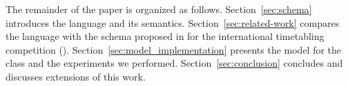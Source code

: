 The remainder of the paper is organized as follows.
Section~\ref{sec:schema} introduces the {\UTP} language and its semantics.
Section~\ref{sec:related-work} compares the \UTP{} language with the schema proposed in \cite{2018muller,ITC2019} for the international timetabling competition ({\ITC}).
Section~\ref{sec:model_implementation} presents the {\CP} model for the {\UTP} class and the experiments we performed.
Section~\ref{sec:conclusion} concludes and discusses extensions of this work.